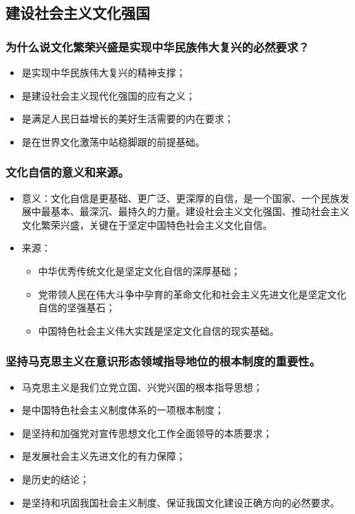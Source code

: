 \documentclass{article}
\begin{document}
\subsection{建设社会主义文化强国}

\subsubsection{为什么说文化繁荣兴盛是实现中华民族伟大复兴的必然要求？}
\begin{itemize}
    \item 是实现中华民族伟大复兴的精神支撑；
    \item 是建设社会主义现代化强国的应有之义；
    \item 是满足人民日益增长的美好生活需要的内在要求；
    \item 是在世界文化激荡中站稳脚跟的前提基础。
\end{itemize}

\subsubsection{文化自信的意义和来源。}
\begin{itemize}
    \item 意义：文化自信是更基础、更广泛、更深厚的自信，是一个国家、一个民族发展中最基本、最深沉、最持久的力量。建设社会主义文化强国、推动社会主义文化繁荣兴盛，关键在于坚定中国特色社会主义文化自信。
    \item 来源：
    \begin{itemize}
        \item 中华优秀传统文化是坚定文化自信的深厚基础；
        \item 党带领人民在伟大斗争中孕育的革命文化和社会主义先进文化是坚定文化自信的坚强基石；
        \item 中国特色社会主义伟大实践是坚定文化自信的现实基础。
    \end{itemize}
\end{itemize}

\subsubsection{坚持马克思主义在意识形态领域指导地位的根本制度的重要性。}
\begin{itemize}
    \item 马克思主义是我们立党立国、兴党兴国的根本指导思想；
    \item 是中国特色社会主义制度体系的一项根本制度；
    \item 是坚持和加强党对宣传思想文化工作全面领导的本质要求；
    \item 是发展社会主义先进文化的有力保障；
    \item 是历史的结论；
    \item 是坚持和巩固我国社会主义制度、保证我国文化建设正确方向的必然要求。
\end{itemize}
\end{document}

